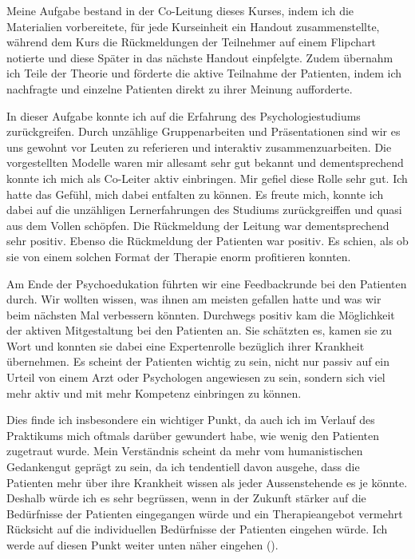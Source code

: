 Meine Aufgabe bestand in der Co-Leitung dieses Kurses, indem ich die Materialien vorbereitete, für jede Kurseinheit ein Handout zusammenstellte, während dem Kurs die Rückmeldungen der Teilnehmer auf einem Flipchart notierte und diese Später in das nächste Handout einpfelgte. Zudem übernahm ich Teile der Theorie und förderte die aktive Teilnahme der Patienten, indem ich nachfragte und einzelne Patienten direkt zu ihrer Meinung aufforderte. 

In dieser Aufgabe konnte ich auf die Erfahrung des Psychologiestudiums zurückgreifen. Durch unzählige Gruppenarbeiten und Präsentationen sind wir es uns gewohnt vor Leuten zu referieren und interaktiv zusammenzuarbeiten. Die vorgestellten Modelle waren mir allesamt sehr gut bekannt und dementsprechend konnte ich mich als Co-Leiter aktiv einbringen. Mir gefiel diese Rolle sehr gut. Ich hatte das Gefühl, mich dabei entfalten zu können. Es freute mich, konnte ich dabei auf die unzähligen Lernerfahrungen des Studiums zurückgreiffen und quasi aus dem Vollen schöpfen. Die Rückmeldung der Leitung war dementsprechend sehr positiv. Ebenso die Rückmeldung der Patienten war positiv. Es schien, als ob sie von einem solchen Format der Therapie enorm profitieren konnten. 

Am Ende der Psychoedukation führten wir eine Feedbackrunde bei den Patienten durch. Wir wollten wissen, was ihnen am meisten gefallen hatte und was wir beim nächsten Mal verbessern könnten. Durchwegs positiv kam die Möglichkeit der aktiven Mitgestaltung bei den Patienten an. Sie schätzten es, kamen sie zu Wort und konnten sie dabei eine Expertenrolle bezüglich ihrer Krankheit übernehmen. Es scheint der Patienten wichtig zu sein, nicht nur passiv auf ein Urteil von einem Arzt oder Psychologen angewiesen zu sein, sondern sich viel mehr aktiv und mit mehr Kompetenz einbringen zu können.

Dies finde ich insbesondere ein wichtiger Punkt, da auch ich im Verlauf des Praktikums mich oftmals darüber gewundert habe, wie wenig den Patienten zugetraut wurde. Mein Verständnis scheint da mehr vom humanistischen Gedankengut geprägt zu sein, da ich tendentiell davon ausgehe, dass die Patienten mehr über ihre Krankheit wissen als jeder Aussenstehende es je könnte. Deshalb würde ich es sehr begrüssen, wenn in der Zukunft stärker auf die Bedürfnisse der Patienten eingegangen würde und ein Therapieangebot vermehrt Rücksicht auf die individuellen Bedürfnisse der Patienten eingehen würde. Ich werde auf diesen Punkt weiter unten näher eingehen ().

